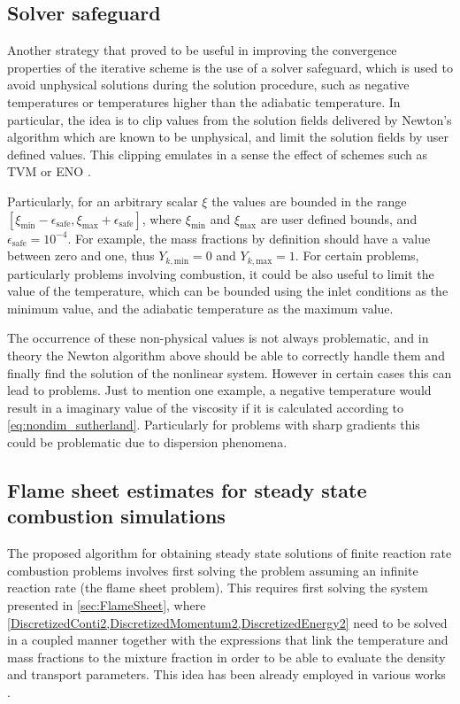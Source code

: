 \subsection{Solver safeguard}
Another strategy that proved to be useful in improving the convergence properties of the iterative scheme is the use of a solver safeguard, which is used to avoid unphysical solutions during the solution procedure, such as negative temperatures or temperatures higher than the adiabatic temperature. In particular, the idea is to clip values from the solution fields delivered by Newton's algorithm which are known to be unphysical, and limit the solution fields by user defined values. This clipping emulates in a sense the effect of schemes such as \gls{TVM} or \gls{ENO} \parencite{nicoudConservativeHighOrderFiniteDifference2000}. 

Particularly, for an arbitrary scalar $\xi$ the values are bounded in the range $[\xi_{\text{min}} - \epsilon_{\text{safe}}, \xi_{\text{max}} + \epsilon_{\text{safe}}]$, where $\xi_{\text{min}}$ and $\xi_{\text{max}}$ are user defined bounds, and  $\epsilon_{\text{safe}} = 10^{-4}$. For example, the mass fractions by definition should have a value between zero and one, thus $Y_{k,\text{min}} = 0$ and  $Y_{k,\text{max}} = 1$. For certain problems, particularly problems involving combustion, it could be also useful to limit the value of the temperature, which can be bounded using the inlet conditions as the minimum value, and the adiabatic temperature as the maximum value.

The occurrence of these non-physical values is not always problematic, and in theory the Newton algorithm above should be able to correctly handle them and finally find the solution of the nonlinear system. However in certain cases this can lead to problems. Just to mention one example, a negative temperature would result in a imaginary value of the viscosity if it is calculated according to \cref{eq:nondim_sutherland}. Particularly for problems with sharp gradients this could be problematic due to dispersion phenomena. 

\subsection{Flame sheet estimates for steady state combustion simulations}\label{ssec:MethodCombustion}
The proposed algorithm for obtaining steady state solutions of finite reaction rate combustion problems involves first solving the problem assuming an infinite reaction rate (the flame sheet problem). This requires first solving the system presented in \cref{sec:FlameSheet}, where \cref{DiscretizedConti2,DiscretizedMomentum2,DiscretizedEnergy2} need to be solved in a coupled manner together with the expressions that link the temperature and mass fractions to the mixture fraction in order to be able to evaluate the density and transport parameters. This idea has been already employed in various works \parencite{smookeNumericalSolutionTwoDimensional1986,smookeNumericalModelingAxisymmetric1992}.

